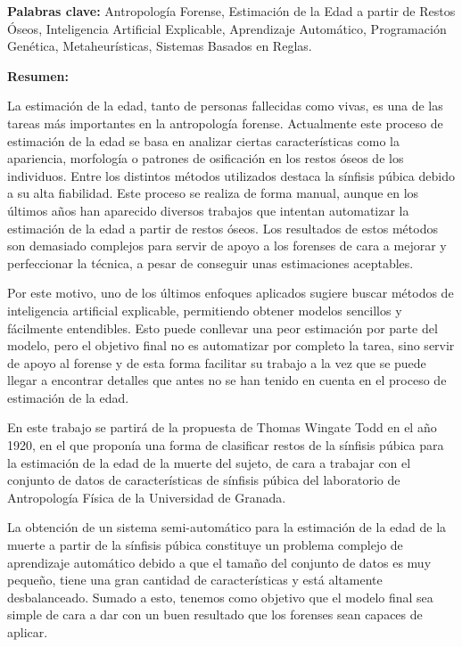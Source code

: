\clearpage
\begin{center}
	{\large\textbf{\thetitle}}


	\theauthor
\end{center}

\textbf{Palabras clave:} Antropología Forense, Estimación de la Edad a partir de Restos Óseos, Inteligencia Artificial Explicable, Aprendizaje Automático, Programación Genética, Metaheurísticas, Sistemas Basados en Reglas.

\textbf{Resumen:}

La estimación de la edad, tanto de personas fallecidas como vivas, es una de las tareas más importantes en la antropología forense. Actualmente este proceso de estimación de la edad se basa en analizar ciertas características como la apariencia, morfología o patrones de osificación en los restos óseos de los individuos. Entre los distintos métodos utilizados destaca la sínfisis púbica debido a su alta fiabilidad. Este proceso se realiza de forma manual, aunque en los últimos años han aparecido diversos trabajos que intentan automatizar la estimación de la edad a partir de restos óseos. Los resultados de estos métodos son demasiado complejos para servir de apoyo a los forenses de cara a mejorar y perfeccionar la técnica, a pesar de conseguir unas estimaciones aceptables.

Por este motivo, uno de los últimos enfoques aplicados sugiere buscar métodos de inteligencia artificial explicable, permitiendo obtener modelos sencillos y fácilmente entendibles. Esto puede conllevar una peor estimación por parte del modelo, pero el objetivo final no es automatizar por completo la tarea, sino servir de apoyo al forense y de esta forma facilitar su trabajo a la vez que se puede llegar a encontrar detalles que antes no se han tenido en cuenta en el proceso de estimación de la edad.

En este trabajo se partirá de la propuesta de Thomas Wingate Todd en el año 1920, en el que proponía una forma de clasificar restos de la sínfisis púbica para la estimación de la edad de la muerte del sujeto, de cara a trabajar con el conjunto de datos de características de sínfisis púbica del laboratorio de Antropología Física de la Universidad de Granada.

La obtención de un sistema semi-automático para la estimación de la edad de la muerte a partir de la sínfisis púbica constituye un problema complejo de aprendizaje automático debido a que el tamaño del conjunto de datos es muy pequeño, tiene una gran cantidad de características y está altamente desbalanceado. Sumado a esto, tenemos como objetivo que el modelo final sea simple de cara a dar con un buen resultado que los forenses sean capaces de aplicar.

